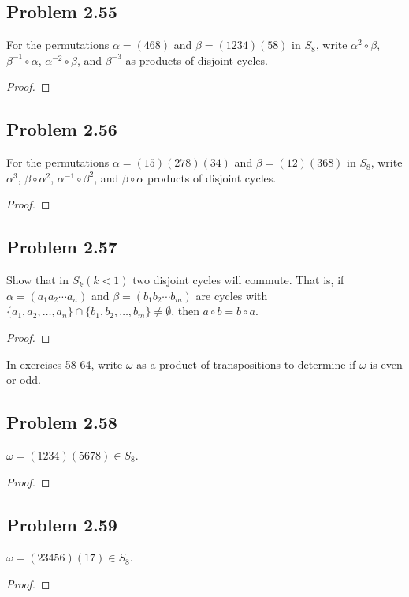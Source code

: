 \documentclass{amsbook}
\begin{document}
			\subsection*{Problem 2.55}
			\label{sub:problem_2_55}
			For the permutations $\alpha = (468)$ and $\beta = (1234)(58)$ in $S_{8}$, write $\alpha^{2} \circ \beta$, $\beta^{-1} \circ \alpha$, $\alpha^{-2} \circ \beta$, and $\beta^{-3}$ as products of disjoint cycles. 
			\begin{proof}
			\end{proof}

			\subsection*{Problem 2.56}
			\label{sub:problem_2_56}
			For the permutations $\alpha = (15)(278)(34)$ and $\beta = (12)(368)$ in $S_{8}$, write $\alpha^{3}$, $\beta \circ \alpha^{2}$, $\alpha^{-1} \circ \beta^{2}$, and $\beta \circ \alpha$ products of disjoint cycles.
			\begin{proof}
			\end{proof}

			\subsection*{Problem 2.57}
			\label{sub:problem_2_57}
			Show that in $S_{k} (k < 1)$ two disjoint cycles will commute. 
			That is, if $\alpha = (a_{1}a_{2} \cdots a_{n})$ and $\beta = (b_{1}b_{2} \cdots b_{m})$ are cycles with $\{ a_{1}, a_{2}, \dots, a_{n} \} \cap \{ b_{1}, b_{2}, \dots, b_{m} \} \neq \emptyset$, then $a \circ b = b \circ a$.
			\begin{proof}
			\end{proof}

			In exercises 58-64, write $\omega$ as a product of transpositions to determine if $\omega$ is even or odd.

			\subsection*{Problem 2.58}
			\label{sub:problem_2_58}
			$\omega = (1234)(5678) \in S_{8}$.
			\begin{proof}
			\end{proof}

			\subsection*{Problem 2.59}
			\label{sub:problem_2_59}
			$\omega = (23456)(17) \in S_{8}$.
			\begin{proof}
			\end{proof}
\end{document}
